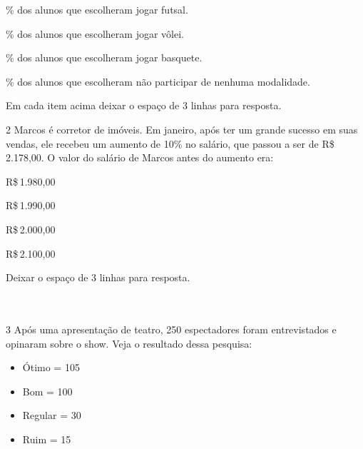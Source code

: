 \begin{escolha}[itemsep=-5pt]
\item \% dos alunos que escolheram jogar futsal.\\
\item \% dos alunos que escolheram jogar vôlei.\\
\item \% dos alunos que escolheram jogar basquete.\\
\item \% dos alunos que escolheram não participar de nenhuma modalidade.\\
\end{escolha}

Em cada item acima deixar o espaço de 3 linhas para resposta.






\num{2} Marcos é corretor de imóveis. Em janeiro, após ter um grande sucesso
em suas vendas, ele recebeu um aumento de 10\% no salário, que passou a
ser de R\$\,2.178,00. O valor do salário de Marcos antes do aumento era:

\begin{escolha}
\item R\$\,1.980,00
\item R\$\,1.990,00
\item R\$\,2.000,00
\item R\$\,2.100,00
\end{escolha}


Deixar o espaço de 3 linhas para resposta.

\\
\\

\num{3} Após uma apresentação de teatro, 250 espectadores foram entrevistados
e opinaram sobre o show. Veja o resultado dessa pesquisa:

\begin{itemize}
\item
  Ótimo = 105
\item
  Bom = 100
\item
  Regular = 30
\item
  Ruim = 15
\end{itemize}

